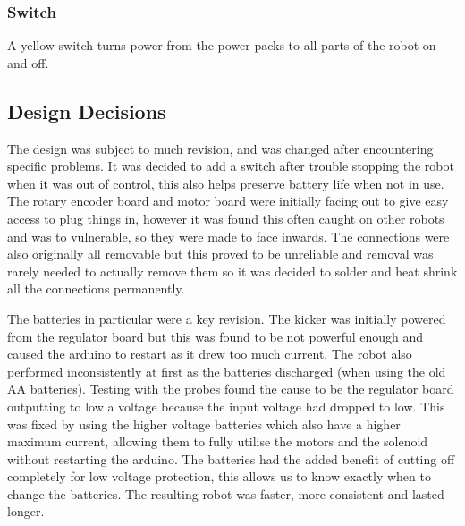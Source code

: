 \subsubsection{Switch}
A yellow switch turns power from the power packs to all parts of the robot on and off.

\subsection{Design Decisions}
The design was subject to much revision, and was changed after encountering specific problems. It was decided to add a switch after trouble stopping the robot when it was out of control, this also helps preserve battery life when not in use. The rotary encoder board and motor board were initially facing out to give easy access to plug things in, however it was found this often caught on other robots and was to vulnerable, so they were made to face inwards. The connections were also originally all removable but this proved to be unreliable and removal was rarely needed to actually remove them so it was decided to solder and heat shrink all the connections permanently.

The batteries in particular were a key revision. The kicker was initially powered from the regulator board but this was found to be not powerful enough and caused the arduino to restart as it drew too much current. The robot also performed inconsistently at first as the batteries discharged (when using the old AA batteries). Testing with the probes found the cause to be the regulator board outputting to low a voltage because the input voltage had dropped to low. This was fixed by using the higher voltage batteries which also have a higher maximum current, allowing them to fully utilise the motors and the solenoid without restarting the arduino. The batteries had the added benefit of cutting off completely for low voltage protection, this allows us to know exactly when to change the batteries. The resulting robot was faster, more consistent and lasted longer. 